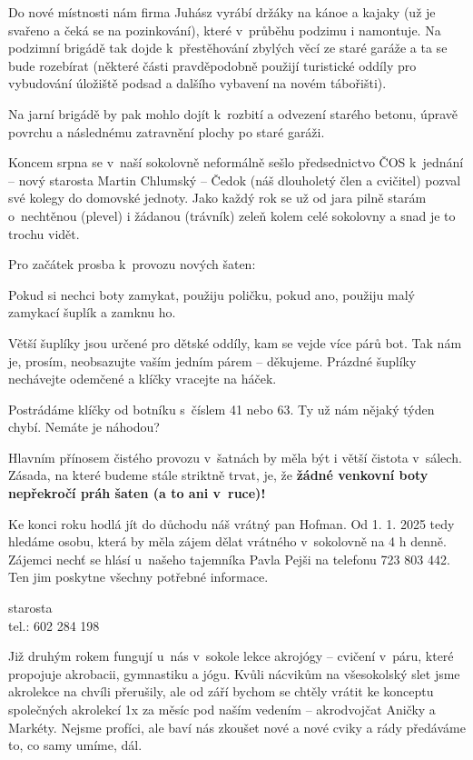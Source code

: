 \documentclass[11pt]{article}
\begin{document}
Do nové místnosti nám firma Juhász vyrábí držáky na kánoe a kajaky (už je svařeno a čeká se na pozinkování), které v~průběhu podzimu i namontuje. Na podzimní brigádě tak dojde k~přestěhování zbylých věcí ze staré garáže a ta se bude rozebírat (některé části pravděpodobně použijí turistické oddíly pro vybudování úložiště podsad a dalšího vybavení na novém tábořišti).

Na jarní brigádě by pak mohlo dojít k~rozbití a odvezení starého betonu, úpravě povrchu a následnému zatravnění plochy po staré garáži.

Koncem srpna se v~naší sokolovně neformálně sešlo předsednictvo ČOS k~jednání – nový starosta Martin Chlumský – Čedok (náš dlouholetý člen a cvičitel) pozval své kolegy do domovské jednoty.
Jako každý rok se už od jara pilně starám o~nechtěnou (plevel) i žádanou (trávník) zeleň kolem celé sokolovny a snad je to trochu vidět.

Pro začátek prosba k~provozu nových šaten:

Pokud si nechci boty zamykat, použiju poličku, pokud ano, použiju malý zamykací šuplík a zamknu ho.

Větší šuplíky jsou určené pro dětské oddíly, kam se vejde více párů bot. Tak nám je, prosím, neobsazujte vaším jedním párem – děkujeme. Prázdné šuplíky nechávejte odemčené a klíčky vracejte na háček.

Postrádáme klíčky od botníku s~číslem 41 nebo 63. Ty už nám nějaký týden chybí. Nemáte je náhodou?

Hlavním přínosem čistého provozu v~šatnách by měla být i větší čistota v~sálech. Zásada, na které budeme stále striktně trvat, je, že \textbf{žádné venkovní boty nepřekročí práh šaten (a to ani v~ruce)!}

\clearpage

Ke konci roku hodlá jít do důchodu náš vrátný pan Hofman. Od 1. 1. 2025 tedy hledáme osobu, která by měla zájem dělat vrátného v~sokolovně na 4 h denně. Zájemci nechť se hlásí u~našeho tajemníka Pavla Pejši na telefonu 723 803 442. Ten jim poskytne všechny potřebné informace.

\signature{Jiří Novák (Jirkan)}{starosta\\tel.: 602 284 198}

Již druhým rokem fungují u~nás v~sokole lekce akrojógy –⁠⁠⁠⁠⁠⁠ cvičení v~páru, které propojuje akrobacii, gymnastiku a jógu. Kvůli nácvikům na všesokolský slet jsme akrolekce na chvíli přerušily, ale od září bychom se chtěly vrátit ke konceptu společných akrolekcí 1x za měsíc pod naším vedením –⁠⁠⁠⁠⁠⁠ akrodvojčat Aničky a Markéty. Nejsme profíci, ale baví nás zkoušet nové a nové cviky a rády předáváme to, co samy umíme, dál.
\end{document}
